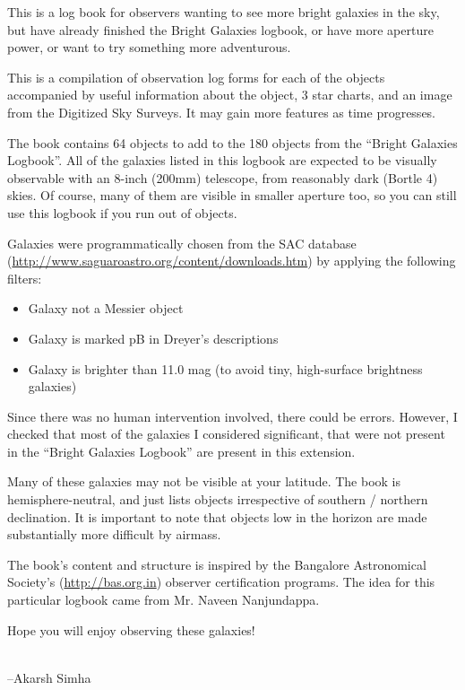 This is a log book for observers wanting to see more bright galaxies
in the sky, but have already finished the Bright Galaxies logbook, or
have more aperture power, or want to try something more adventurous.

This is a compilation of observation log forms for each of the objects
accompanied by useful information about the object, 3 star charts, and
an image from the Digitized Sky Surveys. It may gain more features as
time progresses.

The book contains 64 objects to add to the 180 objects from the
``Bright Galaxies Logbook''. All of the galaxies listed in this
logbook are expected to be visually observable with an 8-inch (200mm)
telescope, from reasonably dark (Bortle 4) skies. Of course, many of
them are visible in smaller aperture too, so you can still use this
logbook if you run out of objects.

Galaxies were programmatically chosen from the SAC database
(\url{http://www.saguaroastro.org/content/downloads.htm}) by applying
the following filters:
\begin{itemize}
\item Galaxy not a Messier object
\item Galaxy is marked pB in Dreyer's descriptions
\item Galaxy is brighter than 11.0 mag (to avoid tiny, high-surface
  brightness galaxies)
\end{itemize}
Since there was no human intervention involved, there could be
errors. However, I checked that most of the galaxies I considered
significant, that were not present in the ``Bright Galaxies Logbook''
are present in this extension.

Many of these galaxies may not be visible at your latitude. The book
is hemisphere-neutral, and just lists objects irrespective of southern
/ northern declination. It is important to note that objects low in
the horizon are made substantially more difficult by airmass.

The book's content and structure is inspired by the Bangalore
Astronomical Society's (\url{http://bas.org.in}) observer
certification programs. The idea for this particular logbook came from
Mr. Naveen Nanjundappa.

Hope you will enjoy observing these galaxies!

\\

\hfill --Akarsh Simha
